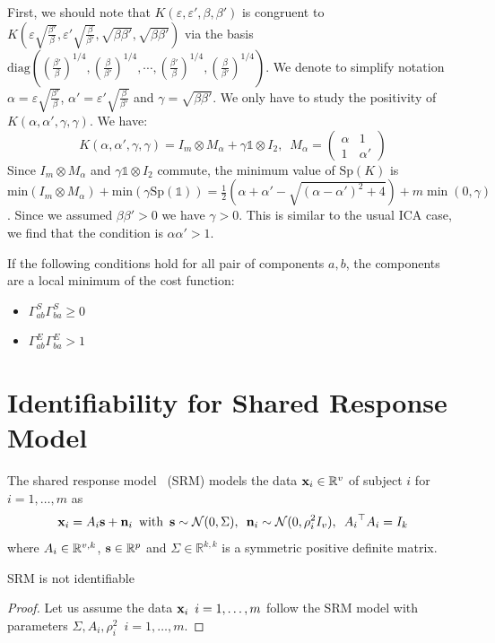 \documentclass{report}
\begin{document}
{First, we should note that $K(\varepsilon, \varepsilon', \beta, \beta') $ is congruent to $K(\varepsilon \sqrt{\frac{\beta'}{\beta}}, \varepsilon' \sqrt{\frac{\beta}{\beta'}}, \sqrt{\beta\beta'}, \sqrt{\beta\beta'})$ via the basis $\text{diag}((\frac{\beta'}{\beta})^{1/4}, (\frac{\beta}{\beta'})^{1/4}, \cdots,(\frac{\beta'}{\beta})^{1/4}, (\frac{\beta}{\beta'})^{1/4})$.
%
We denote to simplify notation $\alpha = \varepsilon \sqrt{\frac{\beta'}{\beta}}$, $\alpha' = \varepsilon' \sqrt{\frac{\beta}{\beta'}}$ and $\gamma = \sqrt{\beta\beta'}$. We only have to study the positivity of $K(\alpha, \alpha', \gamma, \gamma)$.
We have:
$$
K(\alpha, \alpha', \gamma, \gamma) =  I_m  \otimes M_\alpha+ \gamma  \mathbb{1}\otimes I_2, \enspace M_\alpha = 
\begin{pmatrix}
\alpha & 1 \\
1 & \alpha'
\end{pmatrix}
$$
Since $I_m\otimes M_\alpha$ and $\gamma \mathbb{1}\otimes I_2$ commute, the minimum value of $\text{Sp}(K)$ is $\text{min}(I_m\otimes M_\alpha) + \text{min}(\gamma\text{Sp}(\mathbb{1}))=\frac12(\alpha + \alpha' - \sqrt{(\alpha - \alpha')^2 + 4}) + m\min(0, \gamma)$.
Since we assumed $\beta \beta' > 0$ we have $\gamma > 0$. This is similar to the usual ICA case, we find that the condition is $\alpha\alpha' > 1$.

If the following conditions hold for all pair of components $a, b$, the components are a local minimum of the cost function:
\begin{itemize}
    \item $\Gamma^S_{ab}\Gamma^S_{ba}\geq 0$
    \item $\Gamma^E_{ab}\Gamma^E_{ba} > 1$
\end{itemize}
\section{Identifiability for Shared Response Model}
\label{sec:app_identifiability}
The shared response model~\cite{chen2015reduced} (SRM) models the data $\mathbf{x}_i \in \mathbb{R}^v$ of subject $i$ for $i = 1,\dots, m$ as
\begin{align*}
    \mathbf{x}_i = A_i \mathbf{s} + \mathbf{n}_i \enspace \text{with} \enspace \mathbf{s} \sim \mathcal{N}(0, \Sigma), \enspace\mathbf{n}_i \sim \mathcal{N}(0, \rho_i^2 I_v), \enspace {A_i}^{\top}A_i = I_k
\end{align*}
where $A_i \in \mathbb{R}^{v, k}$, $\mathbf{s} \in \mathbb{R}^p$ and  $\Sigma \in \mathbb{R}^{k, k}$ is a symmetric positive definite matrix.

\begin{proposition}
SRM is not identifiable
\end{proposition}
\begin{proof}
Let us assume the data $\mathbf{x}_i \enspace i=1, \dots, m$ follow the SRM model with parameters $\Sigma, A_i, \rho_i^2 \enspace i=1, \dots, m$. 


\end{proof}}
\end{document}
